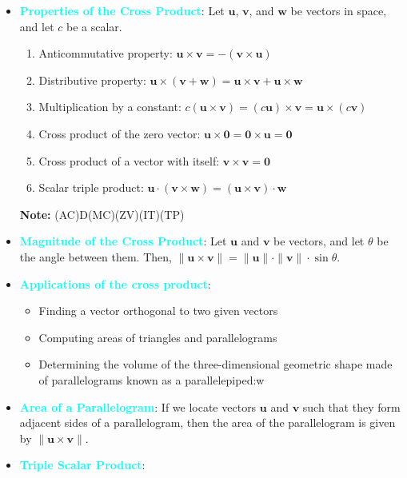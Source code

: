 \documentclass{report}
\begin{document}
\begin{itemize}
            \item \textbf{\textcolor{cyan}{Properties of the Cross Product}}:
                Let $\mathbf{u}$, $\mathbf{v}$, and $\mathbf{w}$ be vectors in space, and let $c$ be a scalar.
                \begin{enumerate}
                    \item Anticommutative property: $\mathbf{u} \times \mathbf{v} = -(\mathbf{v} \times \mathbf{u})$
                    \item Distributive property: $\mathbf{u} \times (\mathbf{v} + \mathbf{w}) = \mathbf{u} \times \mathbf{v} + \mathbf{u} \times \mathbf{w}$
                    \item Multiplication by a constant: $c(\mathbf{u} \times \mathbf{v}) = (c\mathbf{u}) \times \mathbf{v} = \mathbf{u} \times (c\mathbf{v})$
                    \item Cross product of the zero vector: $\mathbf{u} \times \mathbf{0} = \mathbf{0} \times \mathbf{u} = \mathbf{0}$
                    \item Cross product of a vector with itself: $\mathbf{v} \times \mathbf{v} = \mathbf{0}$
                    \item Scalar triple product: $\mathbf{u} \cdot (\mathbf{v} \times \mathbf{w}) = (\mathbf{u} \times \mathbf{v}) \cdot \mathbf{w}$
                \end{enumerate}
                \textbf{Note:} (AC)D(MC)(ZV)(IT)(TP)
            \item \textbf{\textcolor{cyan}{Magnitude of the Cross Product}}:
                Let $\mathbf{u}$ and $\mathbf{v}$ be vectors, and let $\theta$ be the angle between them. Then, $\|\mathbf{u} \times \mathbf{v}\| = \|\mathbf{u}\| \cdot \|\mathbf{v}\| \cdot \sin \theta.$
            \item \textbf{\textcolor{cyan}{Applications of the cross product}}:
            \begin{itemize}
                \item Finding a vector orthogonal to two given vectors
                \item Computing areas of triangles and parallelograms
                \item Determining the volume of the three-dimensional geometric shape made of parallelograms known as a parallelepiped:w

            \end{itemize}
        \item \textbf{\textcolor{cyan}{Area of a Parallelogram}}:
            If we locate vectors $\mathbf{u}$ and $\mathbf{v}$ such that they form adjacent sides of a parallelogram, then the area of the parallelogram is given by $\|\mathbf{u} \times \mathbf{v}\|$.
        \item \textbf{\textcolor{cyan}{Triple Scalar Product}}:


\end{itemize}
\end{document}
